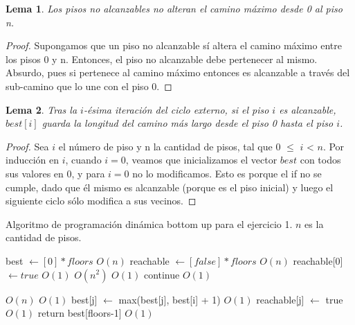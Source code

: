 \documentclass{article}
\newtheorem{lemma}{Lema}[theorem]
\theoremstyle{definition}
\theoremstyle{remark}
\begin{document}
\begin{lemma}
Los pisos no alcanzables no alteran el camino máximo desde 0 al piso n.
\end{lemma}

\begin{proof}
Supongamos que un piso no alcanzable sí altera el camino máximo entre los pisos 0 y n. Entonces, el piso no alcanzable debe pertenecer al mismo. Absurdo, pues si pertenece al camino máximo entonces es alcanzable a través del sub-camino que lo une con el piso 0.
\end{proof}

\begin{lemma}
Tras la $i$-ésima iteración del ciclo externo, si el piso $i$ es alcanzable, $best[i]$ guarda la longitud del camino más largo desde el piso 0 hasta el piso $i$.
\end{lemma}

\begin{proof}
Sea $i$ el número de piso y n la cantidad de pisos, tal que 0 $\leq$ $i$ < $n$. Por inducción en $i$, cuando $i = 0$, veamos que inicializamos el vector $best$ con todos sus valores en 0, y para $i = 0$ no lo modificamos. Esto es porque el if no se cumple, dado que él mismo es alcanzable (porque es el piso inicial) y luego el siguiente ciclo sólo modifica a sus vecinos. 


\end{proof}

\begin{algorithm}[h!]
\caption{Algoritmo de programación dinámica bottom up para el ejercicio 1. $n$ es la cantidad de pisos.\label{alg:ex1}}

\begin{algorithmic}[h!]
\State best $\gets [0] * floors$ \Comment $O(n)$
\State reachable $\gets [false] * floors$ \Comment $O(n)$
\State reachable[0] $\gets true$ \Comment $O(1)$
 \Comment $O(n^2)$
     \Comment $O(1)$
        \State continue \Comment $O(1)$
    \EndIf
    
     \Comment $O(n)$
         \Comment $O(1)$
            \State best[j] $\gets$ max(best[j], best[i] + 1) \Comment $O(1)$
            \State reachable[j] $\gets$ true \Comment $O(1)$
        \EndIf    
    \EndFor
\EndFor
\State return best[floors-1] \Comment $O(1)$
\EndProcedure\\
\end{algorithmic}
\end{algorithm}
\end{document}
